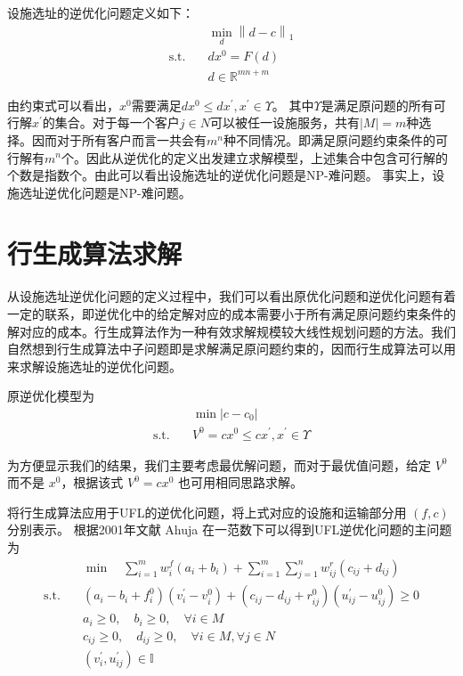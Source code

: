 \documentclass[UTF8]{article}
\begin{document}
设施选址的逆优化问题定义如下：
\begin{align*}
&\min_{d} \left\|d-c\right\|_1 \\
\text{s.t.}\quad & dx^0 = F(d) \\
& d \in \mathbb{R}^{mn+m}
\end{align*}

由约束式可以看出，$x^0$需要满足$dx^0 \leq dx^{'}, x^{'} \in \Upsilon$。 其中$\Upsilon$是满足原问题的所有可行解$x^{'}$的集合。对于每一个客户$j \in N$可以被任一设施服务，共有$|M|=m$种选择。因而对于所有客户而言一共会有$m^n$种不同情况。即满足原问题约束条件的可行解有$m^n$个。因此从逆优化的定义出发建立求解模型，上述集合中包含可行解的个数是指数个。由此可以看出设施选址的逆优化问题是NP-难问题。
事实上，设施选址逆优化问题是NP-难问题。


\section{行生成算法求解}
从设施选址逆优化问题的定义过程中，我们可以看出原优化问题和逆优化问题有着一定的联系，即逆优化中的给定解对应的成本需要小于所有满足原问题约束条件的解对应的成本。行生成算法作为一种有效求解规模较大线性规划问题的方法。我们自然想到行生成算法中子问题即是求解满足原问题约束的，因而行生成算法可以用来求解设施选址的逆优化问题。

原逆优化模型为
\begin{align*}
&\min |c-c_0|  \\
\text{s.t.}\quad & V^0 = cx^0 \leq cx^{'}, x^{'} \in \Upsilon
\end{align*}


为方便显示我们的结果，我们主要考虑最优解问题，而对于最优值问题，给定 $V^0$ 而不是 $x^0$，根据该式 $V^0 = cx^0$ 也可用相同思路求解。

将行生成算法应用于UFL的逆优化问题，将上式对应的设施和运输部分用 $(f,c)$ 分别表示。
根据2001年文献 Ahuja 在一范数下可以得到UFL逆优化问题的主问题为
\begin{align*}
&\min \quad \sum_{i=1}^m w_i^f(a_i+b_i)+\sum_{i=1}^m\sum_{j=1}^n w_{ij}^r(c_{ij}+d_{ij})\\
\text{s.t.}\quad & (a_i-b_i+f_i^0)(v_i^{'}-v_i^{0}) + (c_{ij}-d_{ij}+r_{ij}^0)(u_{ij}^{'}-u_{ij}^{0})  \geq 0 \\
& a_i \geq 0 ,\quad b_i \geq 0,\quad \forall i \in M \\
& c_{ij} \geq 0, \quad d_{ij} \geq 0, \quad \forall i \in M, \forall j \in N\\
& (v_i^{'},u_{ij}^{'}) \in \mathbb{I}
\end{align*}
\end{document}
